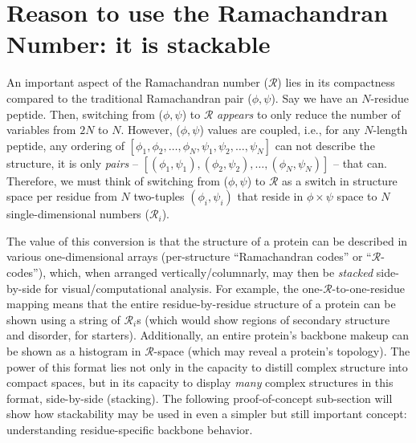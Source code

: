\documentclass[fleqn,10pt]{wlpeerj} %
\begin{document}
\section*{Reason to use the Ramachandran Number: it is stackable}

An important aspect of the Ramachandran number ($\mathcal{R}$) lies in its compactness compared to the traditional Ramachandran pair ($\phi,\psi$). Say we have an $N$-residue peptide. Then, switching from ($\phi,\psi$) to $\mathcal{R}$ \textit{appears} to only reduce the number of variables from $2N$ to $N$. However, ($\phi,\psi$) values are coupled, i.e., for any $N$-length peptide, any ordering of $[\phi_1,\phi_2,\ldots,\phi_N,\psi_1,\psi_2,\ldots,\psi_N]$ can not describe the structure, it is only \textit{pairs} -- $[(\phi_1,\psi_1),(\phi_2,\psi_2),\ldots,(\phi_N,\psi_N)]$ -- that can. Therefore, we must think of switching from ($\phi,\psi$) to $\mathcal{R}$ as a switch in structure space per residue from $N$ two-tuples $(\phi_i,\psi_i)$ that reside in $\phi\times\psi$ space to $N$ single-dimensional numbers ($\mathcal{R}_i$).

The value of this conversion is that the structure of a protein can be described in various one-dimensional arrays (per-structure ``Ramachandran codes'' or ``$\mathcal{R}$-codes''), which, when arranged vertically/columnarly, may then be \textit{stacked} side-by-side for visual/computational analysis. For example, the one-$\mathcal{R}$-to-one-residue mapping means that the entire residue-by-residue structure of a protein can be shown using a string of $\mathcal{R}_i$s (which would show regions of secondary structure and disorder, for starters). Additionally, an entire protein's backbone makeup can be shown as a histogram in $\mathcal{R}$-space (which may reveal a protein's topology). The power of this format lies not only in the capacity to distill complex structure into compact spaces, but in its capacity to display {\it many} complex structures in this format, side-by-side (stacking). The following proof-of-concept sub-section will show how stackability may be used in even a simpler but still important concept: understanding residue-specific backbone behavior.
\end{document}
